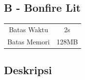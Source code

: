 \documentclass{article}
\begin{document}
\begin{center}
    \section*{B - Bonfire Lit} %

    \begin{tabular}{ | c c | }
        \hline
        Batas Waktu  & 2s \\    %
        Batas Memori & 128MB \\  %
        \hline
    \end{tabular}
\end{center}

\subsection*{Deskripsi}
\end{document}
